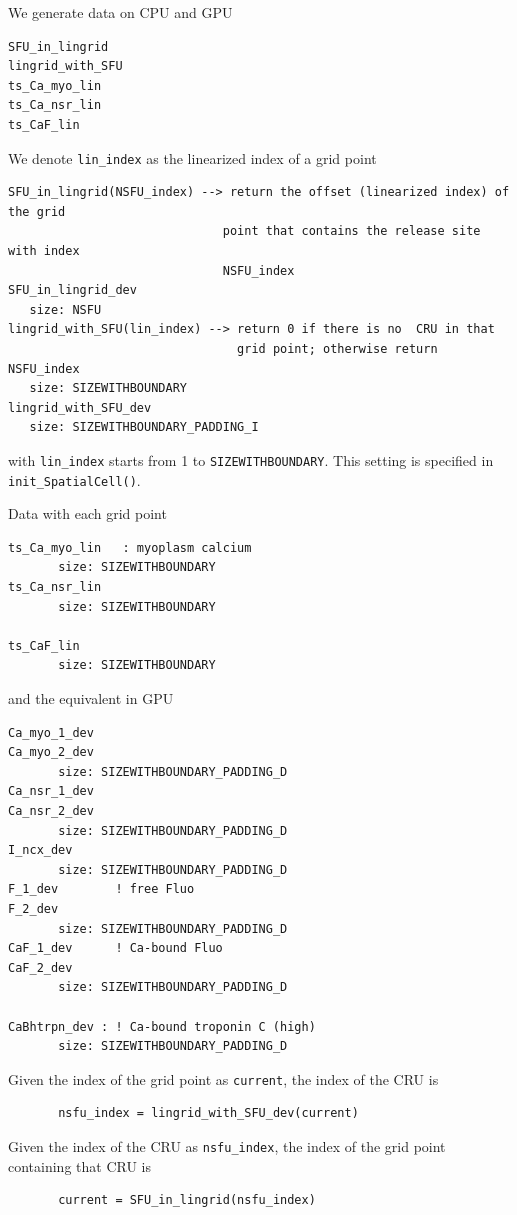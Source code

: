 We generate data on CPU and GPU
\begin{verbatim}
SFU_in_lingrid
lingrid_with_SFU
ts_Ca_myo_lin
ts_Ca_nsr_lin
ts_CaF_lin
\end{verbatim}

We denote \verb!lin_index! as the linearized index of a grid point
\begin{verbatim}
SFU_in_lingrid(NSFU_index) --> return the offset (linearized index) of the grid
                              point that contains the release site with index
                              NSFU_index
SFU_in_lingrid_dev
   size: NSFU
lingrid_with_SFU(lin_index) --> return 0 if there is no  CRU in that
                                grid point; otherwise return NSFU_index
   size: SIZEWITHBOUNDARY
lingrid_with_SFU_dev
   size: SIZEWITHBOUNDARY_PADDING_I

\end{verbatim}
with \verb!lin_index! starts from 1 to
\verb!SIZEWITHBOUNDARY!. This setting is specified in \verb!init_SpatialCell()!.

Data with each grid point
\begin{verbatim}
ts_Ca_myo_lin   : myoplasm calcium
       size: SIZEWITHBOUNDARY
ts_Ca_nsr_lin
       size: SIZEWITHBOUNDARY

ts_CaF_lin
       size: SIZEWITHBOUNDARY
\end{verbatim}
and the equivalent in GPU
\begin{verbatim}
Ca_myo_1_dev
Ca_myo_2_dev
       size: SIZEWITHBOUNDARY_PADDING_D
Ca_nsr_1_dev
Ca_nsr_2_dev
       size: SIZEWITHBOUNDARY_PADDING_D
I_ncx_dev
       size: SIZEWITHBOUNDARY_PADDING_D
F_1_dev        ! free Fluo
F_2_dev
       size: SIZEWITHBOUNDARY_PADDING_D
CaF_1_dev      ! Ca-bound Fluo
CaF_2_dev
       size: SIZEWITHBOUNDARY_PADDING_D

CaBhtrpn_dev : ! Ca-bound troponin C (high)
       size: SIZEWITHBOUNDARY_PADDING_D

\end{verbatim}

Given the index of the grid point as \verb!current!, the index of the CRU 
is 
\begin{verbatim}
       nsfu_index = lingrid_with_SFU_dev(current)
\end{verbatim}

Given the index of the CRU as \verb!nsfu_index!, the index of the grid
point containing that CRU is 
\begin{verbatim}
       current = SFU_in_lingrid(nsfu_index)
\end{verbatim}

